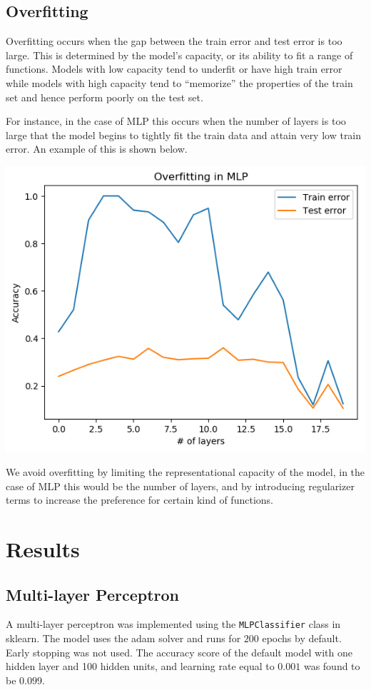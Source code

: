 \documentclass[12pt]{article}
\begin{document}
\subsection*{Overfitting}

Overfitting occurs when the gap between the train error and test error is too large. This is determined by the model's capacity, or its ability to fit a range of functions. Models with low capacity tend to underfit or have high train error while models with high capacity tend to ``memorize'' the properties of the train set and hence perform poorly on the test set.

For instance, in the case of MLP this occurs when the number of layers is too large that the model begins to tightly fit the train data and attain very low train error. An example of this is shown below.

\begin{center}
\includegraphics[scale=0.5]{mlp-overfit.png}
\end{center}


We avoid overfitting by limiting the representational capacity of the model, in the case of MLP this would be the number of layers, and by introducing regularizer terms to increase the preference for certain kind of functions.
\section*{Results}

\subsection*{Multi-layer Perceptron}
A multi-layer perceptron was implemented using the \texttt{MLPClassifier} class in sklearn. The model uses the adam solver and runs for $200$ epochs by default. Early stopping was not used. The accuracy score of the default model with one hidden layer and 100 hidden units, and learning rate equal to $0.001$ was found to be $0.099$.
\end{document}
